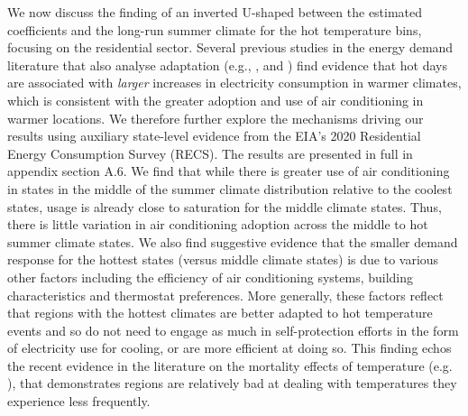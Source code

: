 \documentclass[11pt]{article}
\begin{document}
We now discuss the finding of an inverted U-shaped between the estimated coefficients and the long-run summer climate for the hot temperature bins, focusing on the residential sector. Several previous studies in the energy demand literature that also analyse adaptation (e.g., \cite{Davis5962}, \cite{Rode2021} and \cite{auffhammer2022climate}) find evidence that hot days are associated with \textit{larger} increases in electricity consumption in warmer climates, which is consistent with the greater adoption and use of air conditioning in warmer locations. We therefore further explore the mechanisms driving our results using auxiliary state-level evidence from the EIA's 2020 Residential Energy Consumption Survey (RECS). The results are presented in full in appendix section A.6. We find that while there is greater use of air conditioning in states in the middle of the summer climate distribution relative to the coolest states, usage is already close to saturation for the middle climate states. Thus, there is little variation in air conditioning adoption across the middle to hot summer climate states. We also find suggestive evidence that the smaller demand response for the hottest states (versus middle climate states) is due to various other factors including the efficiency of air conditioning systems, building characteristics and thermostat preferences. More generally, these factors reflect that regions with the hottest climates are better adapted to hot temperature events and so do not need to engage as much in self-protection efforts in the form of electricity use for cooling, or are more efficient at doing so. This finding echos the recent evidence in the literature on the mortality effects of temperature (e.g. \cite{heutel2021adaptation}), that demonstrates regions are relatively bad at dealing with temperatures they experience less frequently. 
\end{document}

